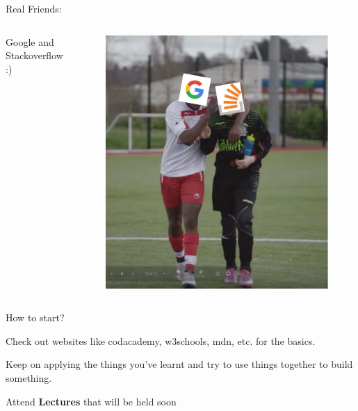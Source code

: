     \begin{frame}{Real Friends:}
    \begin{columns}
        Google and Stackoverflow :)
        \begin{figure}
        \includegraphics[width=1\textwidth]{imgs/friends.jpg}
        \end{figure}
        \end{columns}
    \end{frame}
    \begin{frame}{How to start?}
        \bi
        \item<+-> { Check out websites like codacademy, w3schools, mdn, etc. for the basics.}\\ 
        \item<+->{ Keep on applying the things you've learnt and try to use things together to build something.}\\    
        \item<+-> { Attend \textbf{Lectures} that will be held soon}
        \ei    
    \end{frame}
